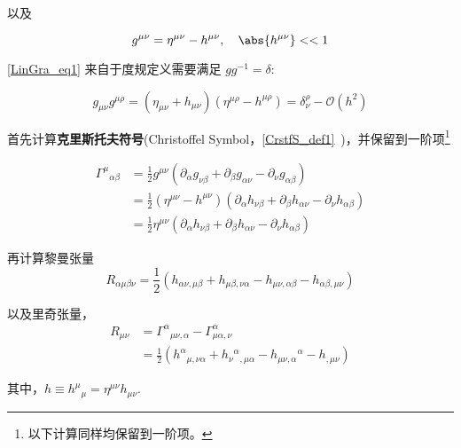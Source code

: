以及

\begin{equation}\label{LinGra_eq1}
g^{\mu\nu} = \eta^{\mu\nu} - h^{\mu\nu} , \quad \abs{h^{\mu\nu}}<<1 
\end{equation}

\autoref{LinGra_eq1} 来自于度规定义需要满足 $gg^{-1}=\delta$:

\begin{equation}
g_{\mu\nu}g^{\mu\rho} = (\eta_{\mu\nu} + h_{\mu\nu})(\eta^{\mu\rho} - h^{\mu\rho}) = \delta^{\rho}_{\nu} - \mathcal{O}(h^2)
\end{equation}

首先计算\textbf{克里斯托夫符号}(Christoffel Symbol，\autoref{CrstfS_def1}~)，并保留到一阶项\footnote{以下计算同样均保留到一阶项。}

\begin{equation}
\begin{aligned}
\Gamma^{\mu}{}_{\alpha\beta}&=\frac{1}{2}g^{\mu\nu}(\partial_\alpha g_{\nu\beta} + \partial_\beta g_{\alpha\nu} - \partial_\nu g_{\alpha\beta})\\
&=\frac{1}{2}(\eta^{\mu\nu} - h^{\mu\nu})(\partial_\alpha h_{\nu\beta} + \partial_\beta h_{\alpha\nu} - \partial_\nu h_{\alpha\beta})\\
&=\frac{1}{2}\eta^{\mu\nu} (\partial_\alpha h_{\nu\beta} + \partial_\beta h_{\alpha\nu} - \partial_\nu h_{\alpha\beta})
\end{aligned}
\end{equation}



再计算黎曼张量
\begin{equation}
R_{\alpha \mu \beta \nu}=\frac{1}{2}\left(h_{\alpha \nu, \mu \beta}+h_{\mu \beta, \nu \alpha}-h_{\mu \nu, \alpha \beta}-h_{\alpha \beta, \mu \nu}\right)
\end{equation}


以及里奇张量，
\begin{equation}
\begin{aligned}
R_{\mu\nu} &= \Gamma^{\alpha}{}_{\mu\nu,\alpha} - \Gamma^{\alpha}_{\mu\alpha,\nu}\\
&=\frac{1}{2}\left(h^{\alpha}{}_{\mu, \nu \alpha} + h_{\nu}{ }^{\alpha}{ }_{, \mu \alpha}-h_{\mu \nu, \alpha}{ }^{\alpha}-h_{, \mu \nu}\right)
\end{aligned}
\end{equation}


其中，$h\equiv h^{\mu}{}_{\mu}=\eta^{\mu\nu}h_{\mu\nu}$.

